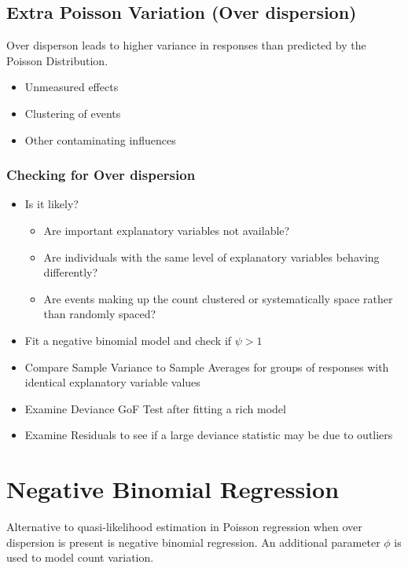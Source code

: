 \documentclass[11pt]{article}
\begin{document}
\subsection{Extra Poisson Variation (Over dispersion)}
\label{sec:org6828fd9}
Over disperson leads to higher variance in responses than predicted by
the Poisson Distribution.

\begin{itemize}
\item Unmeasured effects
\item Clustering of events
\item Other contaminating influences
\end{itemize}

\subsubsection{Checking for Over dispersion}
\label{sec:org1f9ba96}
\begin{itemize}
\item Is it likely?

\begin{itemize}
\item Are important explanatory variables not available?
\item Are individuals with the same level of explanatory variables
behaving differently?
\item Are events making up the count clustered or systematically space
rather than randomly spaced?
\end{itemize}

\item Fit a negative binomial model and check if \(\psi \gt 1\)
\item Compare Sample Variance to Sample Averages for groups of responses
with identical explanatory variable values
\item Examine Deviance GoF Test after fitting a rich model
\item Examine Residuals to see if a large deviance statistic may be due to
outliers
\end{itemize}

\section{Negative Binomial Regression}
\label{sec:org3502815}
Alternative to quasi-likelihood estimation in Poisson regression when
over dispersion is present is negative binomial regression. An
additional parameter \(\phi\) is used to model count variation.
\end{document}
